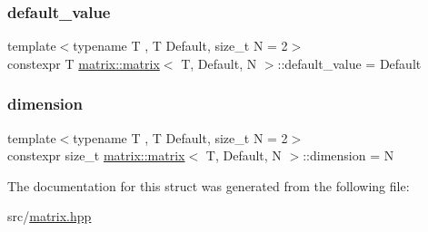 \subsubsection{\texorpdfstring{default\+\_\+value}{default\_value}}
{\footnotesize\ttfamily template$<$typename T , T Default, size\+\_\+t N = 2$>$ \\
constexpr T \hyperlink{structmatrix_1_1matrix}{matrix\+::matrix}$<$ T, Default, N $>$\+::default\+\_\+value = Default\hspace{0.3cm}{\ttfamily [static]}}

\mbox{\label{structmatrix_1_1matrix_a7d76bd51fd998974f59ea4035e053f74}} 
\subsubsection{\texorpdfstring{dimension}{dimension}}
{\footnotesize\ttfamily template$<$typename T , T Default, size\+\_\+t N = 2$>$ \\
constexpr size\+\_\+t \hyperlink{structmatrix_1_1matrix}{matrix\+::matrix}$<$ T, Default, N $>$\+::dimension = N\hspace{0.3cm}{\ttfamily [static]}}



The documentation for this struct was generated from the following file\+:\begin{DoxyCompactItemize}
\item 
src/\hyperlink{matrix_8hpp}{matrix.\+hpp}\end{DoxyCompactItemize}
